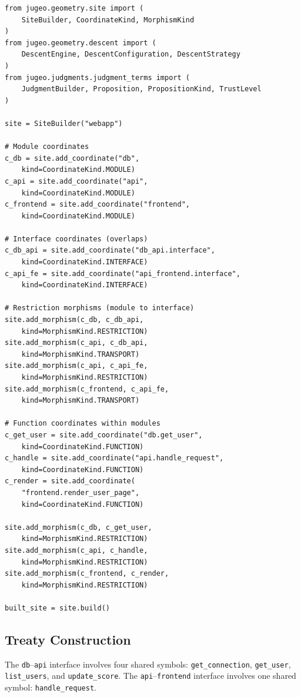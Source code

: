 \documentclass[11pt]{article}
\begin{document}
\begin{lstlisting}[style=jugeo-python,caption={Site for the three-module application.}]
from jugeo.geometry.site import (
    SiteBuilder, CoordinateKind, MorphismKind
)
from jugeo.geometry.descent import (
    DescentEngine, DescentConfiguration, DescentStrategy
)
from jugeo.judgments.judgment_terms import (
    JudgmentBuilder, Proposition, PropositionKind, TrustLevel
)

site = SiteBuilder("webapp")

# Module coordinates
c_db = site.add_coordinate("db",
    kind=CoordinateKind.MODULE)
c_api = site.add_coordinate("api",
    kind=CoordinateKind.MODULE)
c_frontend = site.add_coordinate("frontend",
    kind=CoordinateKind.MODULE)

# Interface coordinates (overlaps)
c_db_api = site.add_coordinate("db_api.interface",
    kind=CoordinateKind.INTERFACE)
c_api_fe = site.add_coordinate("api_frontend.interface",
    kind=CoordinateKind.INTERFACE)

# Restriction morphisms (module to interface)
site.add_morphism(c_db, c_db_api,
    kind=MorphismKind.RESTRICTION)
site.add_morphism(c_api, c_db_api,
    kind=MorphismKind.TRANSPORT)
site.add_morphism(c_api, c_api_fe,
    kind=MorphismKind.RESTRICTION)
site.add_morphism(c_frontend, c_api_fe,
    kind=MorphismKind.TRANSPORT)

# Function coordinates within modules
c_get_user = site.add_coordinate("db.get_user",
    kind=CoordinateKind.FUNCTION)
c_handle = site.add_coordinate("api.handle_request",
    kind=CoordinateKind.FUNCTION)
c_render = site.add_coordinate(
    "frontend.render_user_page",
    kind=CoordinateKind.FUNCTION)

site.add_morphism(c_db, c_get_user,
    kind=MorphismKind.RESTRICTION)
site.add_morphism(c_api, c_handle,
    kind=MorphismKind.RESTRICTION)
site.add_morphism(c_frontend, c_render,
    kind=MorphismKind.RESTRICTION)

built_site = site.build()
\end{lstlisting}

\subsection{Treaty Construction}

The \texttt{db}--\texttt{api} interface involves four shared symbols:
\texttt{get\_connection}, \texttt{get\_user}, \texttt{list\_users},
and \texttt{update\_score}.  The \texttt{api}--\texttt{frontend}
interface involves one shared symbol: \texttt{handle\_request}.
\end{document}
